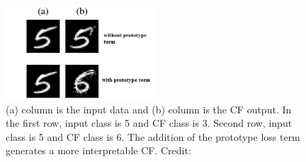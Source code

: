 
\begin{figure}
  \centering
  \includegraphics[width=0.5\textwidth]{proto.PNG}
  \caption{(a) column is the input data and (b) column is the CF output. In the first row, input class is 5 and CF class is 3. Second row, input class is 5 and CF class is 6. The addition of the prototype loss term generates a more interpretable CF. Credit: \cite{prototype}
  }
  \label{fig:protoresult}
\end{figure}

